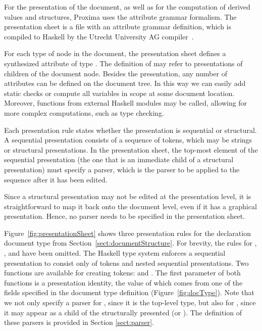 \documentclass{article}[10pt]
\begin{document}
For the presentation of the document, as well as for the computation of derived values and structures, Proxima uses the attribute grammar formalism. The presentation sheet is a file with an attribute grammar definition, which is compiled to Haskell by the Utrecht University AG compiler~\cite{swierstra08ag}.

For each type of node in the document, the presentation sheet defines a synthesized attribute  of type . The definition of  may refer to presentations of children of the document node. Besides the presentation, any number of attributes can be defined on the document tree. In this way we can easily add static checks or compute all variables in scope at some document location. Moreover, functions from external Haskell modules may be called, allowing for more complex computations, such as type checking.


Each presentation rule states whether the presentation is sequential or structural. A sequential presentation consists of a sequence of tokens, which may be strings or structural presentations. In the presentation sheet, the top-most element of the sequential presentation (the one that is an immediate child of a structural presentation) must specify a parser, which is the parser to be applied to the sequence after it has been edited.

Since a structural presentation may not be edited at the presentation level, it is straightforward to map it back onto the document level, even if it has a graphical presentation. Hence, no parser needs to be specified in the presentation sheet.

Figure~\ref{fig:presentationSheet} shows three presentation rules for the declaration document type from Section~\ref{sect:documentStructure}. For brevity, the rules for , , and  have been omitted. The Haskell type system enforces a sequential presentation to consist only of tokens and nested sequential presentations. Two functions are available for creating tokens:  and . The first parameter of both functions is a presentation identity, the value of which comes from one of the  fields specified in the document type definition (Figure~\ref{fig:docType}). Note that we not only specify a parser for , since it is the top-level type, but also for , since it may appear as a child of the structurally presented  (or ). The definition of these parsers is provided in Section \ref{sect:parser}.
\end{document}
